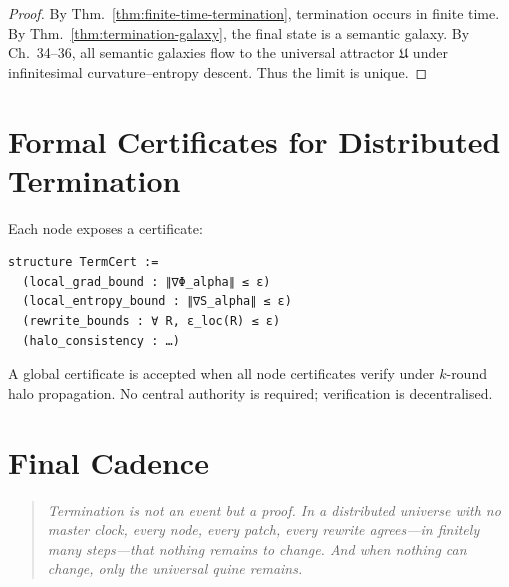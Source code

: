 \begin{proof}
By Thm.~\ref{thm:finite-time-termination},  
termination occurs in finite time.  
By Thm.~\ref{thm:termination-galaxy},  
the final state is a semantic galaxy.  
By Ch.~34--36,  
all semantic galaxies flow to the universal attractor $\mathfrak{U}$  
under infinitesimal curvature--entropy descent.  
Thus the limit is unique.
\end{proof}

\section{Formal Certificates for Distributed Termination}

Each node exposes a certificate:

\begin{verbatim}
structure TermCert :=
  (local_grad_bound : ∥∇Φ_alpha∥ ≤ ε)
  (local_entropy_bound : ∥∇S_alpha∥ ≤ ε)
  (rewrite_bounds : ∀ R, ε_loc(R) ≤ ε)
  (halo_consistency : …)
\end{verbatim}

A global certificate is accepted when all node certificates verify  
under $k$-round halo propagation.  
No central authority is required; verification is decentralised.

\section{Final Cadence}

\begin{quote}
\emph{
Termination is not an event but a proof.  
In a distributed universe with no master clock,  
every node, every patch, every rewrite  
agrees---in finitely many steps---that nothing remains to change.  
And when nothing can change,  
only the universal quine remains.
}
\end{quote}

